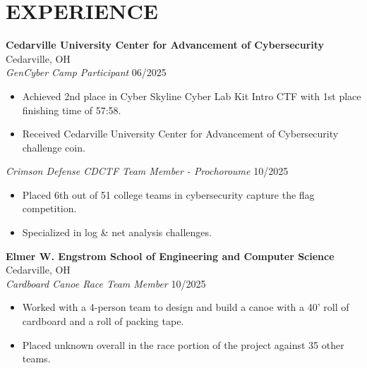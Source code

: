 \documentclass[a4paper,10pt]{article}
\begin{document}

\section{EXPERIENCE}

\textbf{Cedarville University Center for Advancement of Cybersecurity} \hfill Cedarville, OH\\
\textit{GenCyber Camp Participant} \hfill 06/2025
\begin{minipage}{0.8\textwidth}
\begin{itemize}[nosep,after=\strut, leftmargin=1em, itemsep=3pt,label=--]
\item Achieved 2nd place in Cyber Skyline Cyber Lab Kit Intro CTF with 1st place finishing time of 57:58.
\item Received Cedarville University Center for Advancement of Cybersecurity challenge coin.
\end{itemize}
\end{minipage}

\textit{Crimson Defense CDCTF Team Member - Prochoroume} \hfill 10/2025
\begin{minipage}{0.8\textwidth}
\begin{itemize}[nosep,after=\strut, leftmargin=1em, itemsep=3pt,label=--]
\item Placed 6th out of 51 college teams in cybersecurity capture the flag competition.
\item Specialized in log \& net analysis challenges.
\end{itemize}
\end{minipage}

\textbf{Elmer W. Engstrom School of Engineering and Computer Science} \hfill Cedarville, OH\\
\textit{Cardboard Canoe Race Team Member} \hfill 10/2025
\begin{minipage}{0.8\textwidth}
\begin{itemize}[nosep,after=\strut, leftmargin=1em, itemsep=3pt,label=--]
\item Worked with a 4-person team to design and build a canoe with a 40' roll of cardboard and a roll of packing tape.
\item Placed unknown overall in the race portion of the project against 35 other teams.
\end{itemize}
\end{minipage}
\end{document}
